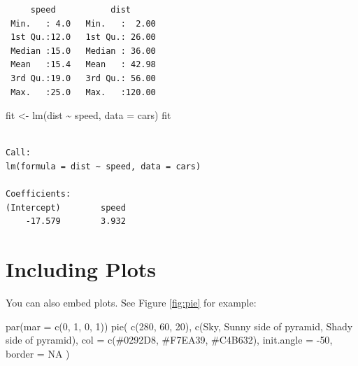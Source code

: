 \documentclass[
]{book}
\newenvironment{Shaded}{\begin{snugshade}}{\end{snugshade}}
\newcommand{\AttributeTok}[1]{\textcolor[rgb]{0.77,0.63,0.00}{#1}}
\newcommand{\ConstantTok}[1]{\textcolor[rgb]{0.00,0.00,0.00}{#1}}
\newcommand{\DecValTok}[1]{\textcolor[rgb]{0.00,0.00,0.81}{#1}}
\newcommand{\FunctionTok}[1]{\textcolor[rgb]{0.00,0.00,0.00}{#1}}
\newcommand{\NormalTok}[1]{#1}
\newcommand{\OtherTok}[1]{\textcolor[rgb]{0.56,0.35,0.01}{#1}}
\newcommand{\SpecialCharTok}[1]{\textcolor[rgb]{0.00,0.00,0.00}{#1}}
\newcommand{\StringTok}[1]{\textcolor[rgb]{0.31,0.60,0.02}{#1}}
\begin{document}
\begin{verbatim}
     speed           dist       
 Min.   : 4.0   Min.   :  2.00  
 1st Qu.:12.0   1st Qu.: 26.00  
 Median :15.0   Median : 36.00  
 Mean   :15.4   Mean   : 42.98  
 3rd Qu.:19.0   3rd Qu.: 56.00  
 Max.   :25.0   Max.   :120.00  
\end{verbatim}

\begin{Shaded}
\begin{Highlighting}[]
\NormalTok{fit }\OtherTok{\textless{}{-}} \FunctionTok{lm}\NormalTok{(dist }\SpecialCharTok{\textasciitilde{}}\NormalTok{ speed, }\AttributeTok{data =}\NormalTok{ cars)}
\NormalTok{fit}
\end{Highlighting}
\end{Shaded}

\begin{verbatim}

Call:
lm(formula = dist ~ speed, data = cars)

Coefficients:
(Intercept)        speed  
    -17.579        3.932  
\end{verbatim}

\hypertarget{including-plots}{%
\section{Including Plots}\label{including-plots}}

You can also embed plots. See Figure \ref{fig:pie} for example:

\begin{Shaded}
\begin{Highlighting}[]
\FunctionTok{par}\NormalTok{(}\AttributeTok{mar =} \FunctionTok{c}\NormalTok{(}\DecValTok{0}\NormalTok{, }\DecValTok{1}\NormalTok{, }\DecValTok{0}\NormalTok{, }\DecValTok{1}\NormalTok{))}
\FunctionTok{pie}\NormalTok{(}
  \FunctionTok{c}\NormalTok{(}\DecValTok{280}\NormalTok{, }\DecValTok{60}\NormalTok{, }\DecValTok{20}\NormalTok{),}
  \FunctionTok{c}\NormalTok{(}\StringTok{\textquotesingle{}Sky\textquotesingle{}}\NormalTok{, }\StringTok{\textquotesingle{}Sunny side of pyramid\textquotesingle{}}\NormalTok{, }\StringTok{\textquotesingle{}Shady side of pyramid\textquotesingle{}}\NormalTok{),}
  \AttributeTok{col =} \FunctionTok{c}\NormalTok{(}\StringTok{\textquotesingle{}\#0292D8\textquotesingle{}}\NormalTok{, }\StringTok{\textquotesingle{}\#F7EA39\textquotesingle{}}\NormalTok{, }\StringTok{\textquotesingle{}\#C4B632\textquotesingle{}}\NormalTok{),}
  \AttributeTok{init.angle =} \SpecialCharTok{{-}}\DecValTok{50}\NormalTok{, }\AttributeTok{border =} \ConstantTok{NA}
\NormalTok{)}
\end{Highlighting}
\end{Shaded}
\end{document}

